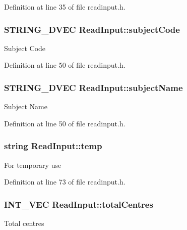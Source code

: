 Definition at line 35 of file readinput.\-h.

\hypertarget{classReadInput_a5db96d61a79c6a36bcdc4907bebf8bd0}{
\subsubsection[{subject\-Code}]{\setlength{\rightskip}{0pt plus 5cm}S\-T\-R\-I\-N\-G\-\_\-D\-V\-E\-C Read\-Input\-::subject\-Code\hspace{0.3cm}{\ttfamily [protected]}}}\label{classReadInput_a5db96d61a79c6a36bcdc4907bebf8bd0}
Subject Code 

Definition at line 50 of file readinput.\-h.

\hypertarget{classReadInput_acbd2ac53fb64da88965fa5e542f2c456}{
\subsubsection[{subject\-Name}]{\setlength{\rightskip}{0pt plus 5cm}S\-T\-R\-I\-N\-G\-\_\-D\-V\-E\-C Read\-Input\-::subject\-Name\hspace{0.3cm}{\ttfamily [protected]}}}\label{classReadInput_acbd2ac53fb64da88965fa5e542f2c456}
Subject Name 

Definition at line 50 of file readinput.\-h.

\hypertarget{classReadInput_ab10b4c63b69664f292d1c66028618008}{
\subsubsection[{temp}]{\setlength{\rightskip}{0pt plus 5cm}string Read\-Input\-::temp\hspace{0.3cm}{\ttfamily [protected]}}}\label{classReadInput_ab10b4c63b69664f292d1c66028618008}
For temporary use 

Definition at line 73 of file readinput.\-h.

\hypertarget{classReadInput_ae6732644e5c3efd46f562493351c9820}{
\subsubsection[{total\-Centres}]{\setlength{\rightskip}{0pt plus 5cm}I\-N\-T\-\_\-\-V\-E\-C Read\-Input\-::total\-Centres\hspace{0.3cm}{\ttfamily [protected]}}}\label{classReadInput_ae6732644e5c3efd46f562493351c9820}
Total centres 

